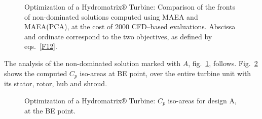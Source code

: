 \begin{figure}[h!]
\begin{minipage}[b]{1\linewidth}
 \centering
\end{minipage}
\caption{Optimization of a Hydromatrix$\circledR$ Turbine: Comparison of the fronts of non-dominated solutions computed using MAEA and MAEA(PCA), at the cost of $2000$ CFD--based evaluations.  Abscissa and ordinate correspond to the two objectives, as defined by eqs.~\ref{F12}.}
\label{pareto_matrix}
\end{figure}
 
 
The analysis of the non-dominated solution marked with $A$, fig.\ \ref{pareto_matrix}, follows. Fig.\ \ref{All_press} shows the computed $C_p$ iso-areas at BE point, over the entire turbine unit with its stator, rotor, hub and shroud. 

\begin{figure}[h!]
\begin{minipage}[b]{1\linewidth}
 \centering
\end{minipage}
\caption{Optimization of a Hydromatrix$\circledR$ Turbine: $C_p$ iso-areas for design A, at the BE point.}
\label{All_press}
\end{figure}


